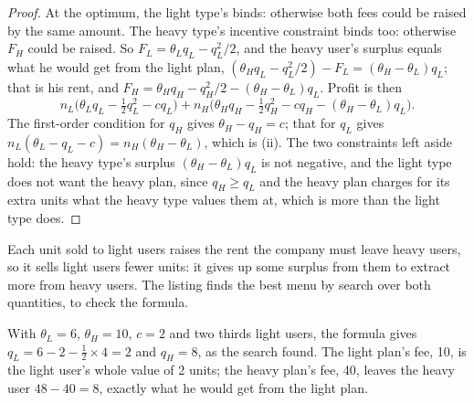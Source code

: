 \begin{proof}
At the optimum, the light type's  binds: otherwise both fees could be raised by the same amount.
The heavy type's incentive constraint binds too: otherwise $F_H$ could be raised. So $F_L = \theta_L q_L - q_L^2/2$, and the heavy user's
surplus equals what he would get from the light plan, $(\theta_H q_L - q_L^2/2) - F_L = (\theta_H - \theta_L)q_L$; that is his rent, and
$F_H = \theta_H q_H - q_H^2/2 - (\theta_H - \theta_L)q_L$. Profit is then
\[
  n_L\bigl(\theta_L q_L - \tfrac12 q_L^2 - c q_L\bigr) + n_H\bigl(\theta_H q_H - \tfrac12 q_H^2 - c q_H - (\theta_H - \theta_L) q_L\bigr).
\]
The first-order condition for $q_H$ gives $\theta_H - q_H = c$; that for $q_L$ gives $n_L(\theta_L - q_L - c) = n_H(\theta_H - \theta_L)$, which is (ii). The
two constraints left aside hold: the heavy type's surplus $(\theta_H - \theta_L)q_L$ is not negative, and the light type does not want
the heavy plan, since $q_H \ge q_L$ and the heavy plan charges for its extra units what the heavy type values them at, which is more
than the light type does.
\end{proof}

Each unit sold to light users raises the rent the company must leave heavy users, so it sells light users fewer units:
it gives up some surplus from them to extract more from heavy users. The listing finds the best menu by search over
both quantities, to check the formula.

\label{lst:b2:signalling-and-screening:menu}

\label{out:b2:signalling-and-screening:menu}

With $\theta_L = 6$, $\theta_H = 10$, $c = 2$ and two thirds light users, the formula gives $q_L = 6 - 2 - \tfrac12 \times 4 = 2$ and $q_H = 8$, as the search
found. The light plan's fee, 10, is the light user's whole value of 2 units; the heavy plan's fee, 40, leaves the heavy
user $48 - 40 = 8$, exactly what he would get from the light plan.

